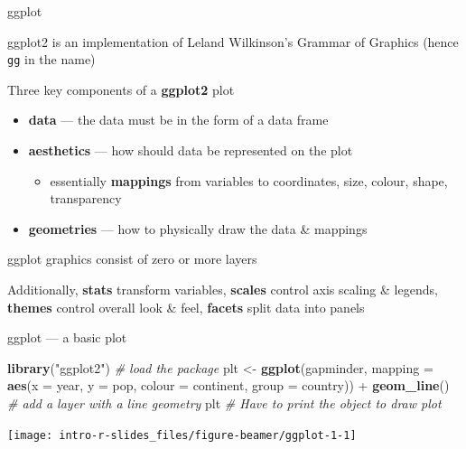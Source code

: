 \documentclass[10pt,ignorenonframetext,compress, aspectratio=169]{beamer}
\newenvironment{Shaded}{\begin{snugshade}}{\end{snugshade}}
\newcommand{\KeywordTok}[1]{\textcolor[rgb]{0.13,0.29,0.53}{\textbf{{#1}}}}
\newcommand{\DataTypeTok}[1]{\textcolor[rgb]{0.13,0.29,0.53}{{#1}}}
\newcommand{\StringTok}[1]{\textcolor[rgb]{0.31,0.60,0.02}{{#1}}}
\newcommand{\CommentTok}[1]{\textcolor[rgb]{0.56,0.35,0.01}{\textit{{#1}}}}
\newcommand{\NormalTok}[1]{{#1}}
\begin{document}
\begin{frame}{ggplot}

\alert{ggplot2} is an implementation of Leland Wilkinson's Grammar of
Graphics (hence \texttt{gg} in the name)

Three key components of a \textbf{ggplot2} plot

\begin{itemize}
\itemsep1pt\parskip0pt
\item
  \textbf{data} --- the data must be in the form of a data frame
\item
  \textbf{aesthetics} --- how should data be represented on the plot

  \begin{itemize}
  \itemsep1pt\parskip0pt
  \item
    essentially \textbf{mappings} from variables to coordinates, size,
    colour, shape, transparency
  \end{itemize}
\item
  \textbf{geometries} --- how to physically draw the data \& mappings
\end{itemize}

ggplot graphics consist of zero or more layers

Additionally, \textbf{stats} transform variables, \textbf{scales}
control axis scaling \& legends, \textbf{themes} control overall look \&
feel, \textbf{facets} split data into panels

\end{frame}

\begin{frame}[fragile]{ggplot --- a basic plot}

\scriptsize

\begin{Shaded}
\begin{Highlighting}[]
\KeywordTok{library}\NormalTok{(}\StringTok{"ggplot2"}\NormalTok{)             }\CommentTok{# load the package}
\NormalTok{plt <-}\StringTok{ }\KeywordTok{ggplot}\NormalTok{(gapminder, }\DataTypeTok{mapping =} \KeywordTok{aes}\NormalTok{(}\DataTypeTok{x =} \NormalTok{year, }\DataTypeTok{y =} \NormalTok{pop, }\DataTypeTok{colour =} \NormalTok{continent, }\DataTypeTok{group =} \NormalTok{country)) +}
\StringTok{         }\KeywordTok{geom_line}\NormalTok{()           }\CommentTok{# add a layer with a line geometry}
\NormalTok{plt                            }\CommentTok{# Have to print the object to draw plot}
\end{Highlighting}
\end{Shaded}

\begin{center}\texttt{[image: intro-r-slides\_files/figure-beamer/ggplot-1-1]} \end{center}

\normalsize

\end{frame}
\end{document}
